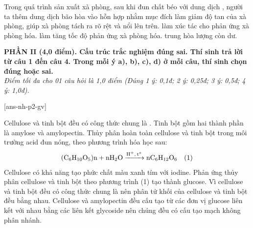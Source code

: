 \documentclass[11pt,a4paper]{article}
\begin{document}
\begin{ex}
Trong quá trình sản xuất xà phòng, sau khi đun chất béo với dung dịch , người ta thêm dung dịch  bão hòa vào hỗn hợp nhằm mục đích
\choice
{\True làm giảm độ tan của xà phòng, giúp xà phòng tách ra rõ rệt và nổi lên trên.}
{làm xúc tác cho phản ứng xà phòng hóa.}
{làm tăng tốc độ phản ứng xà phòng hóa.}
{trung hòa lượng  còn dư.}
\end{ex}


\vspace{5pt}
\noindent
\textbf{\color{mainGreen}PHẦN II (4,0 điểm). Cấu trúc trắc nghiệm đúng sai. Thí sinh trả lời từ câu 1 đến câu 4. Trong mỗi ý a), b), c), d) ở mỗi câu, thí sinh chọn đúng hoặc sai.}\\
\textit{Điểm tối đa cho 01 câu hỏi là 1,0 điểm (Đúng 1 ý: 0,1đ; 2 ý: 0,25đ; 3 ý: 0,5đ; 4 ý: 1,0đ).}

[ans-nh-p2-gv]

\begin{ex}
Cellulose và tinh bột đều có công thức chung là . Tinh bột gồm hai thành phần là amylose và amylopectin. Thủy phân hoàn toàn cellulose và tinh bột trong môi trường acid đun nóng, theo phương trình hóa học sau:
$$\ce{(C6H10O5)n + nH2O ->[H^+, t^o] nC6H12O6}\quad (1)$$
\choiceTF
{Cellulose có khả năng tạo phức chất màu xanh tím với iodine.}
{\True Phản ứng thủy phân cellulose và tinh bột theo phương trình (1) tạo thành glucose.}
{Vì cellulose và tinh bột đều có công thức chung là  nên phân tử khối của cellulose và tinh bột đều bằng nhau.}
{Cellulose và amylopectin đều cấu tạo từ các đơn vị glucose liên kết với nhau bằng các liên kết glycoside nên chúng đều có cấu tạo mạch không phân nhánh.}
\end{ex}
\end{document}
